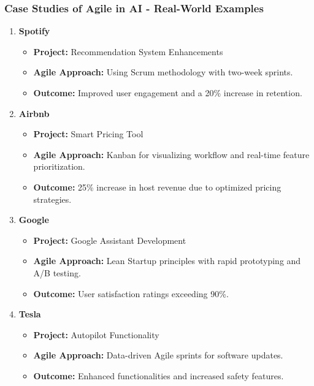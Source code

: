 \documentclass{beamer}
\begin{document}
\begin{frame}[fragile]
    \frametitle{Case Studies of Agile in AI - Real-World Examples}
    \begin{enumerate}
        \item \textbf{Spotify}
        \begin{itemize}
            \item \textbf{Project:} Recommendation System Enhancements
            \item \textbf{Agile Approach:} Using Scrum methodology with two-week sprints.
            \item \textbf{Outcome:} Improved user engagement and a 20\% increase in retention.
        \end{itemize}
        
        \item \textbf{Airbnb}
        \begin{itemize}
            \item \textbf{Project:} Smart Pricing Tool
            \item \textbf{Agile Approach:} Kanban for visualizing workflow and real-time feature prioritization.
            \item \textbf{Outcome:} 25\% increase in host revenue due to optimized pricing strategies.
        \end{itemize}
        
        \item \textbf{Google}
        \begin{itemize}
            \item \textbf{Project:} Google Assistant Development
            \item \textbf{Agile Approach:} Lean Startup principles with rapid prototyping and A/B testing.
            \item \textbf{Outcome:} User satisfaction ratings exceeding 90\%.
        \end{itemize}
        
        \item \textbf{Tesla}
        \begin{itemize}
            \item \textbf{Project:} Autopilot Functionality
            \item \textbf{Agile Approach:} Data-driven Agile sprints for software updates.
            \item \textbf{Outcome:} Enhanced functionalities and increased safety features.
        \end{itemize}
    \end{enumerate}
\end{frame}
\end{document}
